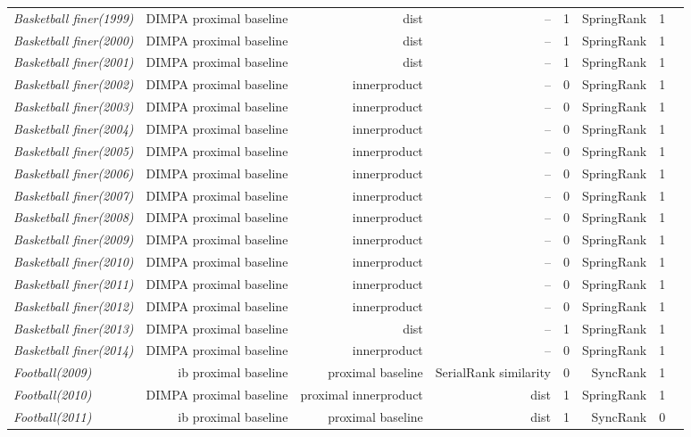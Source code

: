 \documentclass[nohyperref]{article}
\theoremstyle{plain}
\theoremstyle{definition}
\theoremstyle{remark}
\begin{document}
\begin{table*}[!ht]
{\begin{tabular}{lrrrrrrr}
			{\it Basketball finer(1999)} & DIMPA proximal baseline & dist & -- & 1 & SpringRank & 1 \\
			{\it Basketball finer(2000)} & DIMPA proximal baseline & dist & -- & 1 & SpringRank & 1 \\
			{\it Basketball finer(2001)} & DIMPA proximal baseline & dist & -- & 1 & SpringRank & 1 \\
			{\it Basketball finer(2002)} & DIMPA proximal baseline & innerproduct & -- & 0 & SpringRank & 1 \\
			{\it Basketball finer(2003)} & DIMPA proximal baseline & innerproduct & -- & 0 & SpringRank & 1 \\
			{\it Basketball finer(2004)} & DIMPA proximal baseline & innerproduct & -- & 0 & SpringRank & 1 \\
			{\it Basketball finer(2005)} & DIMPA proximal baseline & innerproduct & -- & 0 & SpringRank & 1 \\
			{\it Basketball finer(2006)} & DIMPA proximal baseline & innerproduct & -- & 0 & SpringRank & 1 \\
			{\it Basketball finer(2007)} & DIMPA proximal baseline & innerproduct & -- & 0 & SpringRank & 1 \\
			{\it Basketball finer(2008)} & DIMPA proximal baseline & innerproduct & -- & 0 & SpringRank & 1 \\
			{\it Basketball finer(2009)} & DIMPA proximal baseline & innerproduct & -- & 0 & SpringRank & 1 \\
			{\it Basketball finer(2010)} & DIMPA proximal baseline & innerproduct & -- & 0 & SpringRank & 1 \\
			{\it Basketball finer(2011)} & DIMPA proximal baseline & innerproduct & -- & 0 & SpringRank & 1 \\
			{\it Basketball finer(2012)} & DIMPA proximal baseline & innerproduct & -- & 0 & SpringRank & 1 \\
			{\it Basketball finer(2013)} & DIMPA proximal baseline & dist & -- & 1 & SpringRank & 1 \\
			{\it Basketball finer(2014)} & DIMPA proximal baseline & innerproduct & -- & 0 & SpringRank & 1 \\
			{\it Football(2009)} & ib proximal baseline & proximal baseline & SerialRank similarity & 0 & SyncRank & 1 \\
			{\it Football(2010)} & DIMPA proximal baseline & proximal innerproduct & dist & 1 & SpringRank & 1 \\
			{\it Football(2011)} & ib proximal baseline & proximal baseline & dist & 1 & SyncRank & 0 \\

\end{tabular}}
\end{table*}
\end{document}
